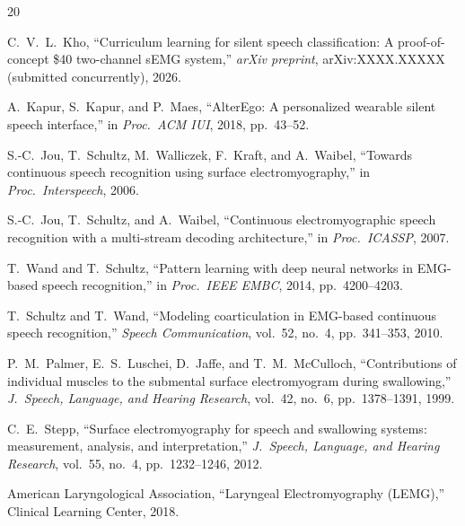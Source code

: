 \documentclass{article}
\begin{document}
\begin{thebibliography}{20}

C.~V.~L.\ Kho, ``Curriculum learning for silent speech classification: A proof-of-concept \$40 two-channel sEMG system,'' \emph{arXiv preprint}, arXiv:XXXX.XXXXX (submitted concurrently), 2026.

A.\ Kapur, S.\ Kapur, and P.\ Maes, ``AlterEgo: A personalized wearable silent speech interface,'' in \emph{Proc.\ ACM IUI}, 2018, pp.\ 43--52.

S.-C.\ Jou, T.\ Schultz, M.\ Walliczek, F.\ Kraft, and A.\ Waibel, ``Towards continuous speech recognition using surface electromyography,'' in \emph{Proc.\ Interspeech}, 2006.

S.-C.\ Jou, T.\ Schultz, and A.\ Waibel, ``Continuous electromyographic speech recognition with a multi-stream decoding architecture,'' in \emph{Proc.\ ICASSP}, 2007.

T.\ Wand and T.\ Schultz, ``Pattern learning with deep neural networks in EMG-based speech recognition,'' in \emph{Proc.\ IEEE EMBC}, 2014, pp.\ 4200--4203.

T.\ Schultz and T.\ Wand, ``Modeling coarticulation in EMG-based continuous speech recognition,'' \emph{Speech Communication}, vol.~52, no.~4, pp.\ 341--353, 2010.

P.~M.\ Palmer, E.~S.\ Luschei, D.\ Jaffe, and T.~M.\ McCulloch, ``Contributions of individual muscles to the submental surface electromyogram during swallowing,'' \emph{J.\ Speech, Language, and Hearing Research}, vol.~42, no.~6, pp.\ 1378--1391, 1999.

C.~E.\ Stepp, ``Surface electromyography for speech and swallowing systems: measurement, analysis, and interpretation,'' \emph{J.\ Speech, Language, and Hearing Research}, vol.~55, no.~4, pp.\ 1232--1246, 2012.

American Laryngological Association, ``Laryngeal Electromyography (LEMG),'' Clinical Learning Center, 2018.


\end{thebibliography}
\end{document}
